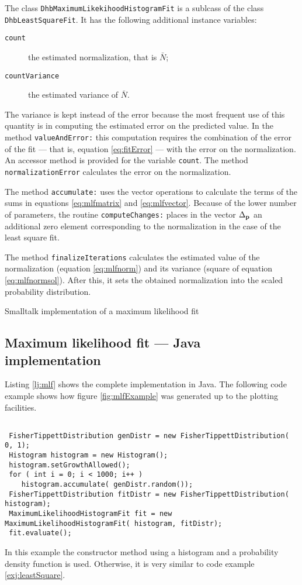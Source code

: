\documentclass[twoside]{book}
\begin{document}
\noindent The class {\tt DhbMaximumLikekihoodHistogramFit} is a
sublcass of the class {\tt DhbLeastSquareFit}. It has the
following additional instance variables:
\begin{description}
  \item[\tt count] the estimated normalization, that is $\bar{N}$;
  \item[\tt countVariance] the estimated variance of $\bar{N}$.
\end{description}
The variance is kept instead of the error because the most
frequent use of this quantity is in computing the estimated error
on the predicted value. In the method {\tt valueAndError:} this
computation requires the combination of the error of the fit ---
that is, equation \ref{eq:fitError} --- with the error on the
normalization. An accessor method is provided for the variable
{\tt count}. The method {\tt normalizationError} calculates the
error on the normalization.

The method {\tt accumulate:} uses the vector operations to
calculate the terms of the sums in equations \ref{eq:mlfmatrix}
and \ref{eq:mlfvector}. Because of the lower number of parameters,
the routine {\tt computeChanges:} places in the vector
$\Delta_{\bf p}$ an additional zero element corresponding to the
normalization in the case of the least square fit.

The method {\tt finalizeIterations} calculates the estimated value
of the normalization (equation \ref{eq:mlfnorm}) and its variance
(square of equation \ref{eq:mlfnormsol}). After this, it sets the
obtained normalization into the scaled probability distribution.

\begin{listing} Smalltalk implementation of a maximum likelihood fit \label{ls:mlf}

\end{listing}

\subsection{Maximum likelihood fit --- Java  implementation}
\label{sec:jmlfhist} Listing \ref{lj:mlf} shows the complete
implementation in Java. The following code example shows how
figure \ref{fig:mlfExample} was generated up to the plotting
facilities.
\begin{codeExample}
\begin{verbatim}

 FisherTippettDistribution genDistr = new FisherTippettDistribution( 0, 1);
 Histogram histogram = new Histogram();
 histogram.setGrowthAllowed();
 for ( int i = 0; i < 1000; i++ )
    histogram.accumulate( genDistr.random());
 FisherTippettDistribution fitDistr = new FisherTippettDistribution( histogram);
 MaximumLikelihoodHistogramFit fit = new MaximumLikelihoodHistogramFit( histogram, fitDistr);
 fit.evaluate();
\end{verbatim}
\end{codeExample} In this example the constructor method using a
histogram and a probability density function is used. Otherwise,
it is very similar to code example \ref{exj:leastSquare}.
\end{document}
